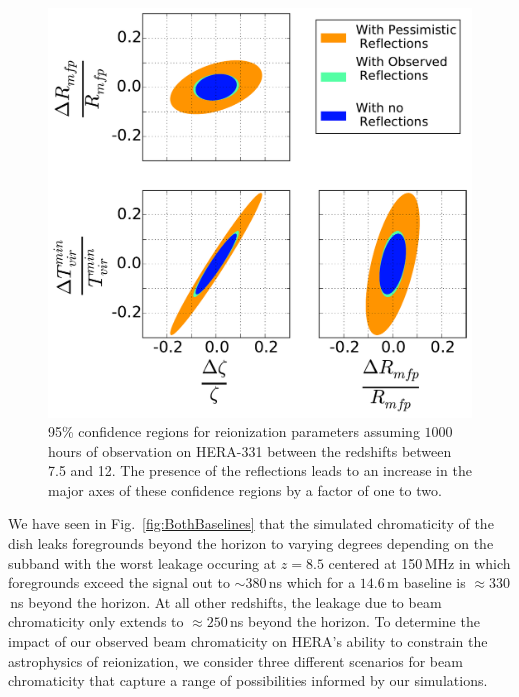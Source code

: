 \documentclass[twocolumn]{emulateapj}
\begin{document}
\begin{figure}[h!]
\includegraphics[width=.5\textwidth]{figures/reionization_triangle_compare_v2.pdf}
\caption{95\% confidence regions for reionization parameters assuming $1000$ hours of observation on HERA-331 between the redshifts between 7.5 and 12. The presence of the reflections leads to an increase in the major axes of these confidence regions by a factor of one to two.}
\label{fig:Confidence}
\end{figure}


We have seen in Fig.~\ref{fig:BothBaselines} that the simulated chromaticity of the dish leaks foregrounds beyond the horizon to varying degrees depending on the subband with the worst leakage occuring at $z=8.5$ centered at 150\,MHz in which foregrounds exceed the signal out to $\sim 380$\,ns which for a $14.6$\,m baseline is $\approx 330$\,ns beyond the horizon. At all other redshifts, the leakage due to beam chromaticity only extends to $\approx 250$\,ns beyond the horizon. To determine the impact of our observed beam chromaticity on HERA's ability to constrain the astrophysics of reionization, we consider three different scenarios for beam chromaticity that capture a range of possibilities informed by our simulations. 
\end{document}
